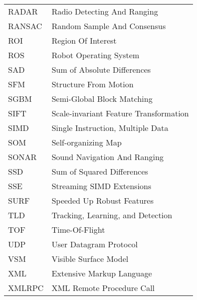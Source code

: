 \documentclass[12pt,a4paper,oneside,pdftex]{report}
\begin{document}
\begin{longtable}{@{}p{}p{}@{}}
RADAR & Radio Detecting And Ranging \\
RANSAC & Random Sample And Consensus \\
ROI & Region Of Interest \\
ROS & Robot Operating System \\
SAD & Sum of Absolute Differences \\
SFM & Structure From Motion \\
SGBM & Semi-Global Block Matching \\
SIFT & Scale-invariant Feature Transformation \\
SIMD & Single Instruction, Multiple Data \\
SOM & Self-organizing Map \\
SONAR & Sound Navigation And Ranging \\
SSD & Sum of Squared Differences \\
SSE & Streaming SIMD Extensions \\
SURF & Speeded Up Robust Features \\
TLD & Tracking, Learning, and Detection \\
TOF & Time-Of-Flight \\
UDP & User Datagram Protocol \\
VSM & Visible Surface Model \\
XML & Extensive Markup Language \\
XMLRPC & XML Remote Procedure Call \\ 
\end{longtable}



\label{pages-prelude}
\cleardoublepage

\startfirstchapter
\end{document}

